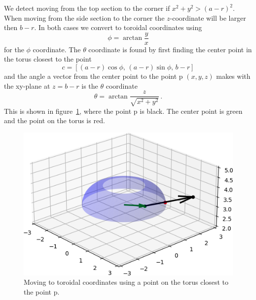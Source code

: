 \documentclass[a4paper,10pt]{article}
\numberwithin{equation}{section}
\begin{document}
We detect moving from the top section to the corner if \(x^2 + y^2 > (a-r)^2\). When moving from the side section to the corner the \(z\)-coordinate will be larger then \(b-r\).
In both cases we convert to toroidal coordinates using
\begin{equation}
  \phi = \arctan{\frac{y}{x}}
\end{equation}
for the \(\phi\) coordinate. The \(\theta\) coordinate is found by first finding the center point in the torus closest to the point
\begin{equation}
  c = \left[ (a-r)\cos{\phi},\, (a-r)\sin{\phi},\, b-r \right]
\end{equation}
and the angle a vector from the center point to the point p \((x, y, z)\) makes with the xy-plane at \(z = b-r\) is the \(\theta\) coordinate
\begin{equation}
  \theta = \arctan{\frac{z}{\sqrt{x^2 + y^2}}}\, .
\end{equation}
This is shown in figure~\ref{fig:tor}, where the point p is black. The center point is green and the point on the torus is red.
\begin{figure}
  \centering
  \includegraphics[scale=0.4]{figures/tor.png}
  \caption{Moving to toroidal coordinates using a point on the torus closest to the point p.}
  \label{fig:tor}
\end{figure}
%
\end{document}

